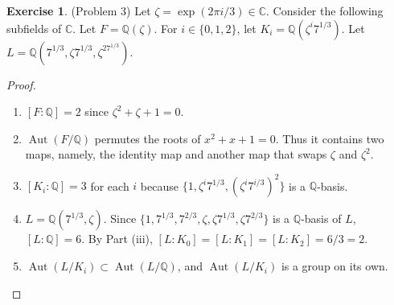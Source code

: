 \documentclass[12pt, psamsfonts]{amsart}
\theoremstyle{definition}
\newtheorem*{exer}{Exercise}
\theoremstyle{remark}
\DeclareMathOperator{\Aut}{Aut}
\numberwithin{equation}{section}
\begin{document}
\begin{exer}{(Problem 3)}
  Let $\zeta = \exp(2\pi i / 3) \in \mathbb{C}$.
  Consider the following subfields of $\mathbb{C}$.
  Let $F = \mathbb{Q}(\zeta)$.
  For $i \in \{ 0, 1, 2 \}$, let $K_i = \mathbb{Q}(\zeta^i7^{1/3})$.
  Let $L = \mathbb{Q}(7^{1/3}, \zeta7^{1/3}, \zeta^27^{1/3})$.
\end{exer}

\begin{proof}
  $ $
  \begin{enumerate}
    \item 
      $[F:\mathbb{Q}] = 2$ since $\zeta^2 + \zeta + 1 = 0$.
    \item
      $\Aut(F/\mathbb{Q})$ permutes the roots of $x^2 + x + 1 = 0$.
      Thus it contains two maps, namely, the identity map and another map that swaps $\zeta$ and $\zeta^2$.
    \item
      $[K_i:\mathbb{Q}] = 3$ for each $i$ because $\{ 1, \zeta^i7^{1/3}, (\zeta^{i}7^{i/3})^2 \}$ is a $\mathbb{Q}$-basis.
    \item
      $L = \mathbb{Q}(7^{1/3}, \zeta)$.
      Since $\{ 1, 7^{1/3}, 7^{2/3}, \zeta, \zeta 7^{1/3}, \zeta 7^{2/3} \}$ is a $\mathbb{Q}$-basis of $L$, $[L:\mathbb{Q}] = 6$.
      By Part (iii), $[L:K_0] = [L:K_1] = [L:K_2] = 6 / 3 = 2$.
    \item
      $\Aut(L/K_i) \subset \Aut(L/\mathbb{Q})$, and $\Aut(L/K_i)$ is a group on its own.
  \end{enumerate}
\end{proof}
\end{document}

